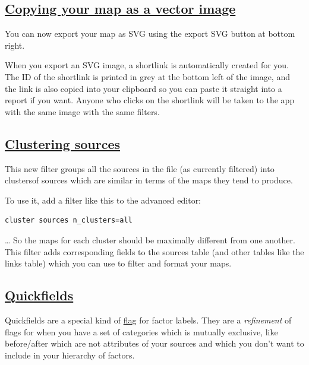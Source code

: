 \documentclass[
]{book}
\begin{document}
\hypertarget{copying-your-map-as-a-vector-image}{%
\subsection{\texorpdfstring{\protect\hyperlink{copy-svg}{Copying your map as a vector image}}{Copying your map as a vector image}}\label{copying-your-map-as-a-vector-image}}

You can now export your map as SVG using the export SVG button at bottom right.

When you export an SVG image, a shortlink is automatically created for you. The ID of the shortlink is printed in grey at the bottom left of the image, and the link is also copied into your clipboard so you can paste it straight into a report if you want. Anyone who clicks on the shortlink will be taken to the app with the same image with the same filters.

\hypertarget{clustering-sources}{%
\subsection{\texorpdfstring{\protect\hyperlink{cluster-sources}{Clustering sources}}{Clustering sources}}\label{clustering-sources}}

This new filter groups all the sources in the file (as currently filtered) into clustersof sources which are similar in terms of the maps they tend to produce.

To use it, add a filter like this to the advanced editor:

\begin{verbatim}
cluster sources n_clusters=all
\end{verbatim}

\ldots{}
So the maps for each cluster should be maximally different from one another. This filter adds corresponding fields to the sources table (and other tables like the links table) which you can use to filter and format your maps.

\hypertarget{quickfields}{%
\subsection{\texorpdfstring{\protect\hyperlink{xquickfields}{Quickfields}}{Quickfields}}\label{quickfields}}

Quickfields are a special kind of \protect\hyperlink{xflag}{flag} for factor labels. They are a \emph{refinement} of flags for when you have a set of categories which is mutually exclusive, like before/after which are not attributes of your sources and which you don't want to include in your hierarchy of factors.
\end{document}
